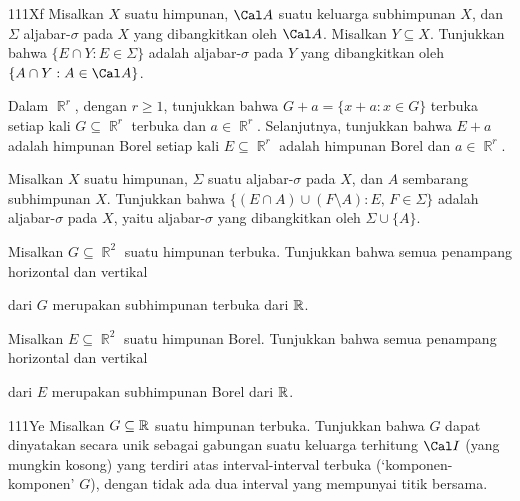 {\spheader 111Xf Misalkan $X$ suatu himpunan, $\Cal A$ suatu keluarga
subhimpunan $X$, dan $\Sigma$ aljabar-$\sigma$ pada $X$ yang
dibangkitkan oleh $\Cal A$. Misalkan
$Y\subseteq X$. Tunjukkan bahwa $\{E\cap Y:E\in\Sigma\}$ adalah
aljabar-$\sigma$ pada $Y$ yang dibangkitkan oleh
$\{A\cap Y:A\in\Cal A\}$.

 Dalam $\BbbR^r$, dengan $r\ge 1$,
tunjukkan bahwa $G+a=\{x+a:x\in G\}$ terbuka setiap kali
$G\subseteq\BbbR^r$ terbuka dan $a\in\BbbR^r$. Selanjutnya, tunjukkan
bahwa $E+a$ adalah himpunan Borel setiap kali $E\subseteq\BbbR^r$
adalah himpunan Borel dan $a\in\BbbR^r$. 

 Misalkan $X$ suatu himpunan, $\Sigma$ suatu
aljabar-$\sigma$ pada $X$, dan $A$ sembarang
subhimpunan $X$. Tunjukkan bahwa $\{(E\cap
A)\cup(F\setminus A):E,\,F\in\Sigma\}$ adalah aljabar-$\sigma$ pada
$X$, yaitu aljabar-$\sigma$ yang dibangkitkan
oleh $\Sigma\cup\{A\}$.

 Misalkan $G\subseteq\BbbR^2$ suatu himpunan
terbuka. Tunjukkan bahwa semua penampang horizontal dan vertikal


\noindent dari $G$ merupakan subhimpunan terbuka dari $\Bbb R$.

 Misalkan $E\subseteq\BbbR^2$ suatu himpunan
Borel. Tunjukkan bahwa semua penampang horizontal dan vertikal


\noindent dari $E$ merupakan subhimpunan Borel dari $\Bbb R$.

\spheader 111Ye Misalkan $G\subseteq\Bbb R$ suatu himpunan terbuka.
Tunjukkan bahwa $G$ dapat dinyatakan secara unik sebagai gabungan suatu
keluarga terhitung $\Cal I$ (yang mungkin kosong) yang terdiri atas
interval-interval terbuka (`komponen-komponen' $G$), dengan tidak ada
dua interval yang mempunyai titik bersama. 
}%

